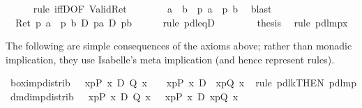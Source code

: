 \begin{isabellebody}
\ \ \ \ \isamarkupfalse%
\ {\isacharparenleft}rule\ iffD{}{\isacharbrackleft}OF\ Valid{\isacharunderscore}Ret{\isacharbrackright}{\isacharparenright}\isanewline
\ \ \ \ \ \ \isamarkupfalse%
\ {\isachardoublequote}a\ {\isacharequal}\ b\ {\isasymlongrightarrow}\ p\ a\ {\isacharequal}\ p\ b{\isachardoublequote}\ \isamarkupfalse%
\ blast\isanewline
\ \ \ \ \isamarkupfalse%
\isanewline
\ \ \isamarkupfalse%
\isanewline
\ \ \isamarkupfalse%
\isanewline
\ \ \isamarkupfalse%
\ {\isachardoublequote}{\isasymturnstile}\ Ret\ {\isacharparenleft}p\ a\ {\isacharequal}\ p\ b{\isacharparenright}\ {\isasymlongrightarrow}\isactrlsub D\ {\isacharquery}pa\ {\isasymlongrightarrow}\isactrlsub D\ {\isacharquery}pb{\isachardoublequote}\isanewline
\ \ \ \ \isamarkupfalse%
\ {\isacharparenleft}rule\ pdl{\isacharunderscore}eqD{\isacharparenright}\isanewline
\ \ \isamarkupfalse%
\ \isanewline
\ \ \isamarkupfalse%
\ {\isacharquery}thesis\ \isamarkupfalse%
\ {\isacharparenleft}rule\ pdl{\isacharunderscore}mp{\isacharunderscore}{}x{\isacharparenright}\isanewline
\isamarkupfalse%
\isamarkupfalse%
%
\begin{isamarkuptext}%
The following are simple consequences of the axioms above;
  rather than monadic implication, they use Isabelle's meta implication
  (and hence represent rules).
  \label{isa:pdl-derived-rules}%
\end{isamarkuptext}%
\isamarkuptrue%
\ box{\isacharunderscore}imp{\isacharunderscore}distrib{\isacharcolon}\ {\isachardoublequote}{\isasymturnstile}\ {\isacharbrackleft}{\isacharhash}\ x{\isasymleftarrow}p{\isacharbrackright}{\isacharparenleft}P\ x\ {\isasymlongrightarrow}\isactrlsub D\ Q\ x{\isacharparenright}\ {\isasymLongrightarrow}\ {\isasymturnstile}\ {\isacharbrackleft}{\isacharhash}\ x{\isasymleftarrow}p{\isacharbrackright}{\isacharparenleft}P\ x{\isacharparenright}\ {\isasymlongrightarrow}\isactrlsub D\ {\isacharbrackleft}{\isacharhash}\ x{\isasymleftarrow}p{\isacharbrackright}{\isacharparenleft}Q\ x{\isacharparenright}{\isachardoublequote}\isanewline
\ \isamarkupfalse%
rule\ pdl{\isacharunderscore}k{}{\isacharbrackleft}THEN\ pdl{\isacharunderscore}mp{\isacharbrackright}{\isacharparenright}\isanewline
\isanewline
\isamarkupfalse%
\ dmd{\isacharunderscore}imp{\isacharunderscore}distrib{\isacharcolon}\ {\isachardoublequote}{\isasymturnstile}\ {\isacharbrackleft}{\isacharhash}\ x{\isasymleftarrow}p{\isacharbrackright}{\isacharparenleft}P\ x\ {\isasymlongrightarrow}\isactrlsub D\ Q\ x{\isacharparenright}\ {\isasymLongrightarrow}\ {\isasymturnstile}\ {\isasymlangle}x{\isasymleftarrow}p{\isasymrangle}{\isacharparenleft}P\ x{\isacharparenright}\ {\isasymlongrightarrow}\isactrlsub D\ {\isasymlangle}x{\isasymleftarrow}p{\isasymrangle}{\isacharparenleft}Q\ x{\isacharparenright}{\isachardoublequote}\isanewline

\end{isabellebody}
